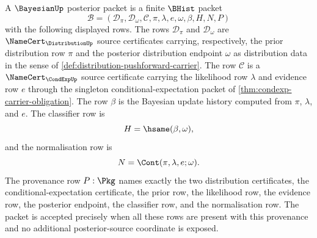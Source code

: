 \begin{definition}
\label{def:bayesian-posterior-packet-carrier}
A $\BayesianUp$ posterior packet is a finite $\BHist$ packet
$$
\mathcal{B}=(\mathcal{D}_{\pi},\mathcal{D}_{\omega},\mathcal{C},\pi,\lambda,e,\omega,\beta,H,N,P)
$$
with the following displayed rows. The rows $\mathcal{D}_{\pi}$ and $\mathcal{D}_{\omega}$ are $\NameCert_{\DistributionUp}$ source certificates carrying, respectively, the prior distribution row $\pi$ and the posterior distribution endpoint $\omega$ as distribution data in the sense of \autoref{def:distribution-pushforward-carrier}. The row $\mathcal{C}$ is a $\NameCert_{\CondExpUp}$ source certificate carrying the likelihood row $\lambda$ and evidence row $e$ through the singleton conditional-expectation packet of \autoref{thm:condexp-carrier-obligation}. The row $\beta$ is the Bayesian update history computed from $\pi$, $\lambda$, and $e$. The classifier row is
$$
H=\hsame(\beta,\omega),
$$
and the normalisation row is
$$
N=\Cont(\pi,\lambda,e;\omega).
$$
The provenance row $P:\Pkg$ names exactly the two distribution certificates, the conditional-expectation certificate, the prior row, the likelihood row, the evidence row, the posterior endpoint, the classifier row, and the normalisation row. The packet is accepted precisely when all these rows are present with this provenance and no additional posterior-source coordinate is exposed.
\end{definition}

